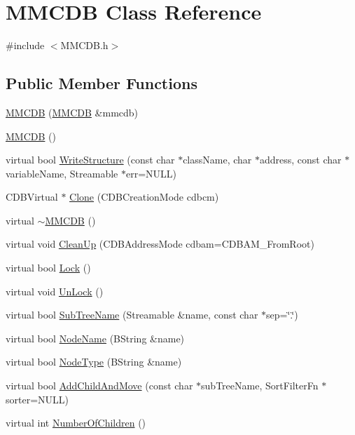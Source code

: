 \hypertarget{classMMCDB}{
\section{MMCDB Class Reference}
\label{classMMCDB}
}


{\ttfamily \#include $<$MMCDB.h$>$}

\subsection*{Public Member Functions}
\begin{DoxyCompactItemize}
\item 
\hyperlink{classMMCDB_a4caf0b624505f7cf5eec2561e2324db2}{MMCDB} (\hyperlink{classMMCDB}{MMCDB} \&mmcdb)
\item 
\hyperlink{classMMCDB_a608fe503c83751b00f7c573da157604c}{MMCDB} ()
\item 
virtual bool \hyperlink{classMMCDB_a40cf641c31363f0df35989871d3d429c}{WriteStructure} (const char $\ast$className, char $\ast$address, const char $\ast$variableName, Streamable $\ast$err=NULL)
\item 
CDBVirtual $\ast$ \hyperlink{classMMCDB_a8e11b4ddcaab0c59e2b537bb869e8140}{Clone} (CDBCreationMode cdbcm)
\item 
virtual \hyperlink{classMMCDB_a80cec4032acc6bab40c397db7038cf0a}{$\sim$MMCDB} ()
\item 
virtual void \hyperlink{classMMCDB_ad46241e2be49936df5545075e8565085}{CleanUp} (CDBAddressMode cdbam=CDBAM\_\-FromRoot)
\item 
virtual bool \hyperlink{classMMCDB_a62105e3dd7022061528e9ea8232e73ef}{Lock} ()
\item 
virtual void \hyperlink{classMMCDB_aafba1fc4a03fc4d72807c3380c1f290e}{UnLock} ()
\item 
virtual bool \hyperlink{classMMCDB_a8b6979852399e578a24ce8db9d4ebf8c}{SubTreeName} (Streamable \&name, const char $\ast$sep=\char`\"{}.\char`\"{})
\item 
virtual bool \hyperlink{classMMCDB_a0780c41ba28c837b62693cc7237ccc5d}{NodeName} (BString \&name)
\item 
virtual bool \hyperlink{classMMCDB_a62a646711f64155b34c17cd42446432e}{NodeType} (BString \&name)
\item 
virtual bool \hyperlink{classMMCDB_a3014aa6014c46becbfa20b1f66171814}{AddChildAndMove} (const char $\ast$subTreeName, SortFilterFn $\ast$sorter=NULL)
\item 
virtual int \hyperlink{classMMCDB_adfa8bed6995045f16e15c4c0b97daa19}{NumberOfChildren} ()

\end{DoxyCompactItemize}
